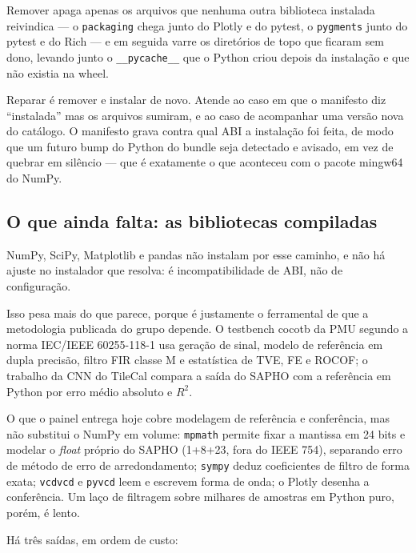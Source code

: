 \documentclass[11pt,a4paper]{article}
\begin{document}
Remover apaga apenas os arquivos que nenhuma outra biblioteca instalada
reivindica — o \texttt{packaging} chega junto do Plotly e do pytest, o
\texttt{pygments} junto do pytest e do Rich — e em seguida varre os diretórios de
topo que ficaram sem dono, levando junto o \texttt{\_\_pycache\_\_} que o Python
criou depois da instalação e que não existia na wheel.

Reparar é remover e instalar de novo. Atende ao caso em que o manifesto diz
``instalada'' mas os arquivos sumiram, e ao caso de acompanhar uma versão nova do
catálogo. O manifesto grava contra qual ABI a instalação foi feita, de modo que
um futuro bump do Python do bundle seja detectado e avisado, em vez de quebrar em
silêncio — que é exatamente o que aconteceu com o pacote mingw64 do NumPy.

\subsection{O que ainda falta: as bibliotecas compiladas}

NumPy, SciPy, Matplotlib e pandas não instalam por esse caminho, e não há ajuste
no instalador que resolva: é incompatibilidade de ABI, não de configuração.

Isso pesa mais do que parece, porque é justamente o ferramental de que a
metodologia publicada do grupo depende. O testbench cocotb da PMU segundo a norma
IEC/IEEE 60255-118-1 usa geração de sinal, modelo de referência em dupla
precisão, filtro FIR classe M e estatística de TVE, FE e ROCOF; o trabalho da CNN
do TileCal compara a saída do SAPHO com a referência em Python por erro médio
absoluto e $R^2$.

O que o painel entrega hoje cobre modelagem de referência e conferência, mas não
substitui o NumPy em volume: \texttt{mpmath} permite fixar a mantissa em 24 bits
e modelar o \emph{float} próprio do SAPHO (1+8+23, fora do IEEE 754), separando
erro de método de erro de arredondamento; \texttt{sympy} deduz coeficientes de
filtro de forma exata; \texttt{vcdvcd} e \texttt{pyvcd} leem e escrevem forma de
onda; o Plotly desenha a conferência. Um laço de filtragem sobre milhares de
amostras em Python puro, porém, é lento.

Há três saídas, em ordem de custo:
\end{document}
